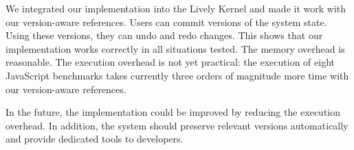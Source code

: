 We integrated our implementation into the Lively Kernel and made it work with our version-aware references.
Users can commit versions of the system state.
Using these versions, they can undo and redo changes.
This shows that our implementation works correctly in all situations tested.
The memory overhead is reasonable.
The execution overhead is not yet practical: the execution of eight JavaScript benchmarks takes currently three orders of magnitude more time with our version-aware references.

In the future, the implementation could be improved by reducing the execution overhead.
In addition, the system should preserve relevant versions automatically and provide dedicated tools to developers.
